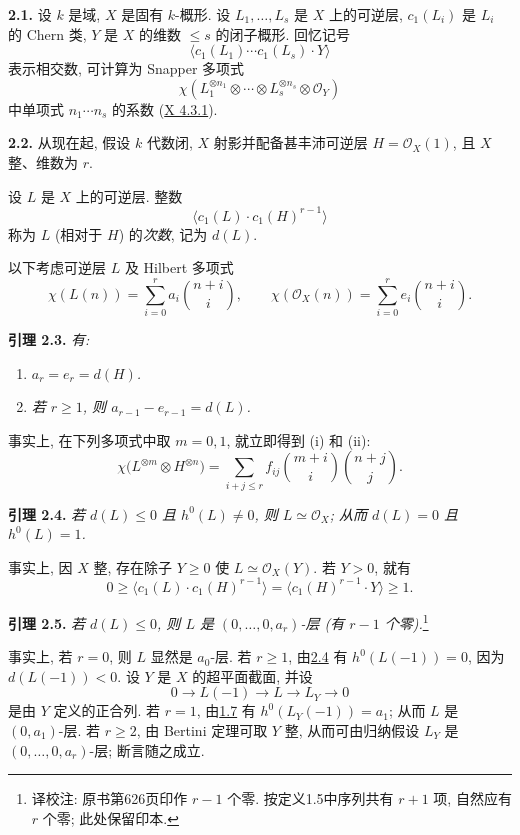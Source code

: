\textbf{2.1.} 设 \(k\) 是域, \(X\) 是固有 \(k\)-概形. 设 \(L_1,\ldots,L_s\) 是 \(X\) 上的可逆层, \(c_1(L_i)\) 是 \(L_i\) 的 Chern 类, \(Y\) 是 \(X\) 的维数 \(\le s\) 的闭子概形. 回忆记号
\[
\bigl\langle c_1(L_1)\cdots c_1(L_s)\cdot Y\bigr\rangle
\]
表示相交数, 可计算为 Snapper 多项式
\[
\chi\!\left(
L_1^{\otimes n_1}\otimes\cdots\otimes L_s^{\otimes n_s}
\otimes\mathcal O_Y
\right)
\]
中单项式 \(n_1\cdots n_s\) 的系数 (\hyperlink{sga6.e10.prop.4-3-1}{X 4.3.1}).

\textbf{2.2.} 从现在起, 假设 \(k\) 代数闭, \(X\) 射影并配备甚丰沛可逆层 \(H=\mathcal O_X(1)\), 且 \(X\) 整、维数为 \(r\).

设 \(L\) 是 \(X\) 上的可逆层. 整数
\[
\bigl\langle c_1(L)\cdot c_1(H)^{r-1}\bigr\rangle
\]
称为 \(L\) (相对于 \(H\)) 的\emph{次数}, 记为 \(d(L)\).

以下考虑可逆层 \(L\) 及 Hilbert 多项式
\[
\chi(L(n))=\sum_{i=0}^{r}a_i\binom{n+i}{i},
\qquad
\chi(\mathcal O_X(n))=\sum_{i=0}^{r}e_i\binom{n+i}{i}.
\]

\textbf{引理 2.3.} \emph{有:}
\begin{enumerate}[label=(\roman*)]
\item \emph{\(a_r=e_r=d(H)\).}
\item \emph{若 \(r\ge1\), 则 \(a_{r-1}-e_{r-1}=d(L)\).}
\end{enumerate}

事实上, 在下列多项式中取 \(m=0,1\), 就立即得到 (i) 和 (ii):
\[
\chi\bigl(L^{\otimes m}\otimes H^{\otimes n}\bigr)
=\sum_{i+j\le r}f_{ij}
\binom{m+i}{i}\binom{n+j}{j}.
\]

\textbf{引理 2.4.} \emph{若 \(d(L)\le0\) 且 \(h^0(L)\ne0\), 则 \(L\simeq\mathcal O_X\); 从而 \(d(L)=0\) 且 \(h^0(L)=1\).}

事实上, 因 \(X\) 整, 存在除子 \(Y\ge0\) 使 \(L\simeq\mathcal O_X(Y)\). 若 \(Y>0\), 就有
\[
0\ge
\bigl\langle c_1(L)\cdot c_1(H)^{r-1}\bigr\rangle
=\bigl\langle c_1(H)^{r-1}\cdot Y\bigr\rangle
\ge1.
\]

\textbf{引理 2.5.} \emph{若 \(d(L)\le0\), 则 \(L\) 是 \((0,\ldots,0,a_r)\)-层 (有 \(r-1\) 个零).}\footnote{译校注: 原书第626页印作 $r-1$ 个零. 按定义1.5中序列共有 $r+1$ 项, 自然应有 $r$ 个零; 此处保留印本.}

事实上, 若 \(r=0\), 则 \(L\) 显然是 \(a_0\)-层. 若 \(r\ge1\), 由\hyperlink{sga6.e13.lem.2-4}{2.4} 有 \(h^0(L(-1))=0\), 因为 \(d(L(-1))<0\). 设 \(Y\) 是 \(X\) 的超平面截面, 并设
\[
0\longrightarrow L(-1)\longrightarrow L\longrightarrow L_Y
\longrightarrow0
\]
是由 \(Y\) 定义的正合列. 若 \(r=1\), 由\hyperlink{sga6.e13.lem.1-7}{1.7} 有 \(h^0(L_Y(-1))=a_1\); 从而 \(L\) 是 \((0,a_1)\)-层. 若 \(r\ge2\), 由 Bertini 定理可取 \(Y\) 整, 从而可由归纳假设 \(L_Y\) 是 \((0,\ldots,0,a_r)\)-层; 断言随之成立.

